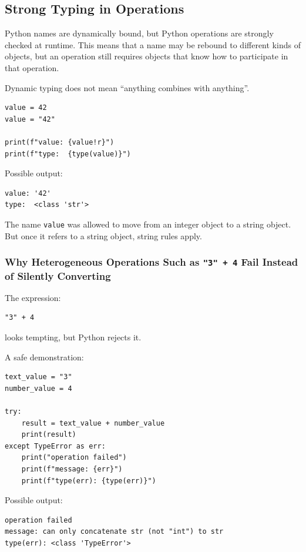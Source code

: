 \subsection{Strong Typing in Operations}

Python names are dynamically bound, but Python operations are strongly checked at runtime. This means that a name may be rebound to different kinds of objects, but an operation still requires objects that know how to participate in that operation.

Dynamic typing does not mean ``anything combines with anything''.

\begin{verbatim}
value = 42
value = "42"

print(f"value: {value!r}")
print(f"type:  {type(value)}")
\end{verbatim}

Possible output:

\begin{verbatim}
value: '42'
type:  <class 'str'>
\end{verbatim}

The name \texttt{value} was allowed to move from an integer object to a string object. But once it refers to a string object, string rules apply.

\subsubsection{Why Heterogeneous Operations Such as \texttt{"3" + 4} Fail Instead of Silently Converting}

The expression:

\begin{verbatim}
"3" + 4
\end{verbatim}

looks tempting, but Python rejects it.

A safe demonstration:

\begin{verbatim}
text_value = "3"
number_value = 4

try:
    result = text_value + number_value
    print(result)
except TypeError as err:
    print("operation failed")
    print(f"message: {err}")
    print(f"type(err): {type(err)}")
\end{verbatim}

Possible output:

\begin{verbatim}
operation failed
message: can only concatenate str (not "int") to str
type(err): <class 'TypeError'>
\end{verbatim}

